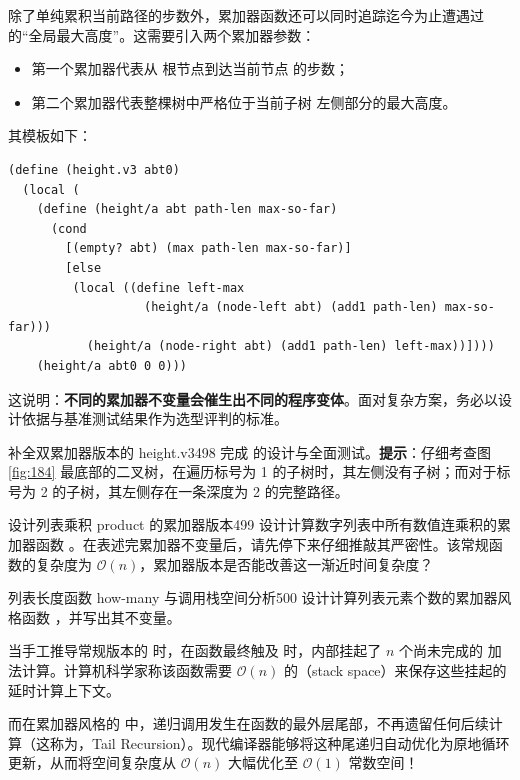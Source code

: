 \begin{notebox}[关于多累加器替代设计的探讨]
除了单纯累积当前路径的步数外，累加器函数还可以同时追踪迄今为止遭遇过的“全局最大高度”。这需要引入两个累加器参数：
\begin{itemize}
  \item 第一个累加器代表从  根节点到达当前节点  的步数；
  \item 第二个累加器代表整棵树中严格位于当前子树  左侧部分的最大高度。
\end{itemize}
其模板如下：
\begin{lstlisting}[language=BSL]
(define (height.v3 abt0)
  (local (
    (define (height/a abt path-len max-so-far)
      (cond
        [(empty? abt) (max path-len max-so-far)]
        [else
         (local ((define left-max
                   (height/a (node-left abt) (add1 path-len) max-so-far)))
           (height/a (node-right abt) (add1 path-len) left-max))])))
    (height/a abt0 0 0)))
\end{lstlisting}
这说明：\textbf{不同的累加器不变量会催生出不同的程序变体}。面对复杂方案，务必以设计依据与基准测试结果作为选型评判的标准。
\end{notebox}

\begin{exercise}{补全双累加器版本的 height.v3}{498}
完成  的设计与全面测试。\textbf{提示}：仔细考查图 \ref{fig:184} 最底部的二叉树，在遍历标号为 1 的子树时，其左侧没有子树；而对于标号为 2 的子树，其左侧存在一条深度为 2 的完整路径。
\end{exercise}

\begin{exercise}{设计列表乘积 product 的累加器版本}{499}
设计计算数字列表中所有数值连乘积的累加器函数 。在表述完累加器不变量后，请先停下来仔细推敲其严密性。该常规函数的复杂度为 $\mathcal{O}(n)$，累加器版本是否能改善这一渐近时间复杂度？
\end{exercise}

\begin{exercise}{列表长度函数 how-many 与调用栈空间分析}{500}
设计计算列表元素个数的累加器风格函数 ，并写出其不变量。

\begin{notebox}
当手工推导常规版本的  时，在函数最终触及 \code{\textquotesingle()} 时，内部挂起了 $n$ 个尚未完成的  加法计算。计算机科学家称该函数需要 $\mathcal{O}(n)$ 的（stack space）来保存这些挂起的延时计算上下文。

而在累加器风格的  中，递归调用发生在函数的最外层尾部，不再遗留任何后续计算（这称为，Tail Recursion）。现代编译器能够将这种尾递归自动优化为原地循环更新，从而将空间复杂度从 $\mathcal{O}(n)$ 大幅优化至 $\mathcal{O}(1)$ 常数空间！
\end{notebox}
\end{exercise}


